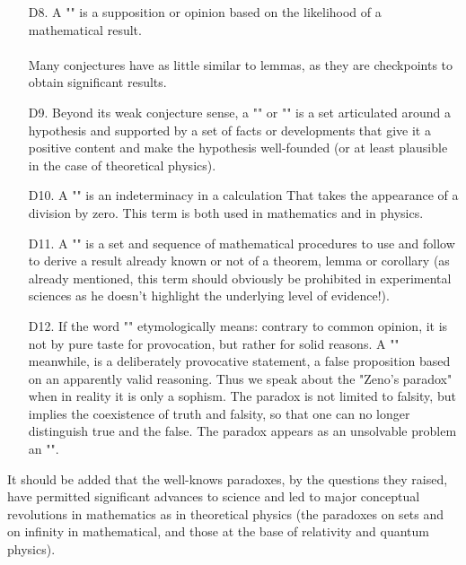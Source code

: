 \begin{itemize}
	\item[D8.] A "" is a supposition or opinion based on the likelihood of a mathematical result.\\\\
	Many conjectures have as little similar to lemmas, as they are checkpoints to obtain significant results.
	
	\item[D9.] Beyond its weak conjecture sense, a "" or "" is a set articulated around a hypothesis and supported by a set of facts or developments that give it a positive content and make the hypothesis well-founded (or at least plausible in the case of theoretical physics). 

	\item[D10.] A "" is an indeterminacy in a calculation That takes the appearance of a division by zero. This term is both used in mathematics and in physics. 

	\item[D11.] A "" is a set and sequence of mathematical procedures to use and follow to derive a result already known or not of a theorem, lemma or corollary (as already mentioned, this term should obviously be prohibited in experimental sciences as he doesn't highlight the underlying level of evidence!). 

	\item[D12.] If the word "" etymologically means: contrary to common opinion, it is not by pure taste for provocation, but rather for solid reasons. A "" meanwhile, is a deliberately provocative statement, a false proposition based on an apparently valid reasoning. Thus we speak about the "Zeno's paradox" when in reality it is only a sophism. The paradox is not limited to falsity, but implies the coexistence of truth and falsity, so that one can no longer distinguish true and the false. The paradox appears as an unsolvable problem an "". 
	
\end{itemize}

	\begin{tcolorbox}[title=Remark,arc=10pt,breakable,drop lifted shadow,
  skin=enhanced,
  skin first is subskin of={enhancedfirst}{arc=10pt,no shadow},
  skin middle is subskin of={enhancedmiddle}{arc=10pt,no shadow},
  skin last is subskin of={enhancedlast}{drop lifted shadow}]
It should be added that the well-knows paradoxes, by the questions they raised, have permitted significant advances to science and led to major conceptual revolutions in mathematics as in theoretical physics (the paradoxes on sets and on infinity in mathematical, and those at the base of relativity and quantum physics).
	\end{tcolorbox}	

